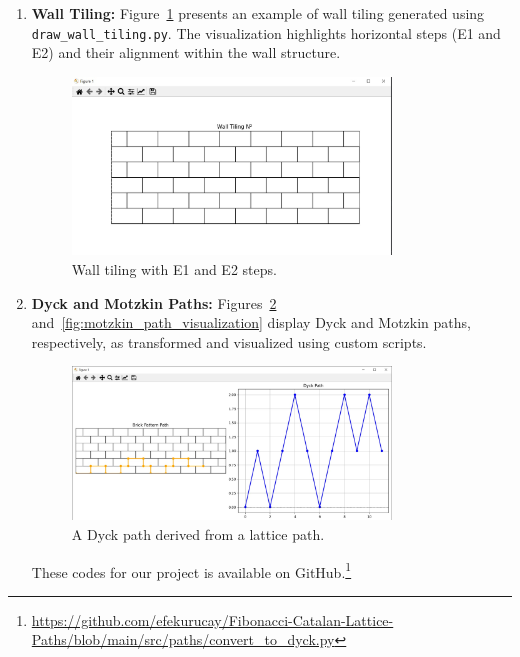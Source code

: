 \documentclass{article}
\begin{document}
\begin{enumerate}
    \item \textbf{Wall Tiling:}
    Figure~\ref{fig:wall_tiling} presents an example of wall tiling generated using \texttt{draw\_wall\_tiling.py}. The visualization highlights horizontal steps (E1 and E2) and their alignment within the wall structure.
    \begin{figure}[h]
        \centering
        \includegraphics[width=0.8\textwidth]{images/walltilling.jpg}
        \caption{Wall tiling with E1 and E2 steps.}
        \label{fig:wall_tiling}
    \end{figure}
    
    \item \textbf{Dyck and Motzkin Paths:}
    Figures~\ref{fig:dyck_path_visualization} and~\ref{fig:motzkin_path_visualization} display Dyck and Motzkin paths, respectively, as transformed and visualized using custom scripts.
    \begin{figure}[h]
        \centering
        \includegraphics[width=0.8\textwidth]{images/dyckpath.jpg}
        \caption{A Dyck path derived from a lattice path.}
        \label{fig:dyck_path_visualization}
    \end{figure}
    These codes for our project is available on GitHub.\footnote{\url{https://github.com/efekurucay/Fibonacci-Catalan-Lattice-Paths/blob/main/src/paths/convert_to_dyck.py}}
    

\end{enumerate}
\end{document}
